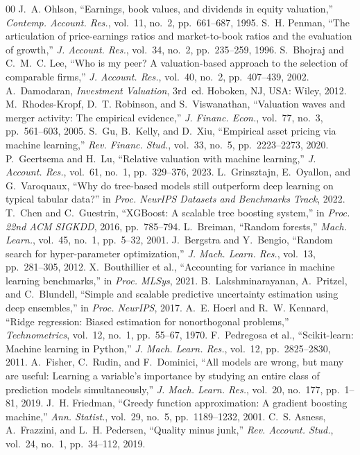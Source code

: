 \documentclass[conference]{IEEEtran}
\begin{document}
\begin{thebibliography}{00}
 J.~A. Ohlson, ``Earnings, book values, and dividends in equity valuation,'' \textit{Contemp. Account. Res.}, vol.~11, no.~2, pp.~661--687, 1995.
 S.~H. Penman, ``The articulation of price-earnings ratios and market-to-book ratios and the evaluation of growth,'' \textit{J. Account. Res.}, vol.~34, no.~2, pp.~235--259, 1996.
 S.~Bhojraj and C.~M.~C. Lee, ``Who is my peer? A valuation-based approach to the selection of comparable firms,'' \textit{J. Account. Res.}, vol.~40, no.~2, pp.~407--439, 2002.
 A.~Damodaran, \textit{Investment Valuation}, 3rd~ed. Hoboken, NJ, USA: Wiley, 2012.
 M.~Rhodes-Kropf, D.~T. Robinson, and S.~Viswanathan, ``Valuation waves and merger activity: The empirical evidence,'' \textit{J. Financ. Econ.}, vol.~77, no.~3, pp.~561--603, 2005.
 S.~Gu, B.~Kelly, and D.~Xiu, ``Empirical asset pricing via machine learning,'' \textit{Rev. Financ. Stud.}, vol.~33, no.~5, pp.~2223--2273, 2020.
 P.~Geertsema and H.~Lu, ``Relative valuation with machine learning,'' \textit{J. Account. Res.}, vol.~61, no.~1, pp.~329--376, 2023.
 L.~Grinsztajn, E.~Oyallon, and G.~Varoquaux, ``Why do tree-based models still outperform deep learning on typical tabular data?'' in \textit{Proc. NeurIPS Datasets and Benchmarks Track}, 2022.
 T.~Chen and C.~Guestrin, ``XGBoost: A scalable tree boosting system,'' in \textit{Proc. 22nd ACM SIGKDD}, 2016, pp.~785--794.
 L.~Breiman, ``Random forests,'' \textit{Mach. Learn.}, vol.~45, no.~1, pp.~5--32, 2001.
 J.~Bergstra and Y.~Bengio, ``Random search for hyper-parameter optimization,'' \textit{J. Mach. Learn. Res.}, vol.~13, pp.~281--305, 2012.
 X.~Bouthillier et al., ``Accounting for variance in machine learning benchmarks,'' in \textit{Proc. MLSys}, 2021.
 B.~Lakshminarayanan, A.~Pritzel, and C.~Blundell, ``Simple and scalable predictive uncertainty estimation using deep ensembles,'' in \textit{Proc. NeurIPS}, 2017.
 A.~E. Hoerl and R.~W. Kennard, ``Ridge regression: Biased estimation for nonorthogonal problems,'' \textit{Technometrics}, vol.~12, no.~1, pp.~55--67, 1970.
 F.~Pedregosa et al., ``Scikit-learn: Machine learning in Python,'' \textit{J. Mach. Learn. Res.}, vol.~12, pp.~2825--2830, 2011.
 A.~Fisher, C.~Rudin, and F.~Dominici, ``All models are wrong, but many are useful: Learning a variable's importance by studying an entire class of prediction models simultaneously,'' \textit{J. Mach. Learn. Res.}, vol.~20, no.~177, pp.~1--81, 2019.
 J.~H. Friedman, ``Greedy function approximation: A gradient boosting machine,'' \textit{Ann. Statist.}, vol.~29, no.~5, pp.~1189--1232, 2001.
 C.~S. Asness, A.~Frazzini, and L.~H. Pedersen, ``Quality minus junk,'' \textit{Rev. Account. Stud.}, vol.~24, no.~1, pp.~34--112, 2019.
\end{thebibliography}
\end{document}
